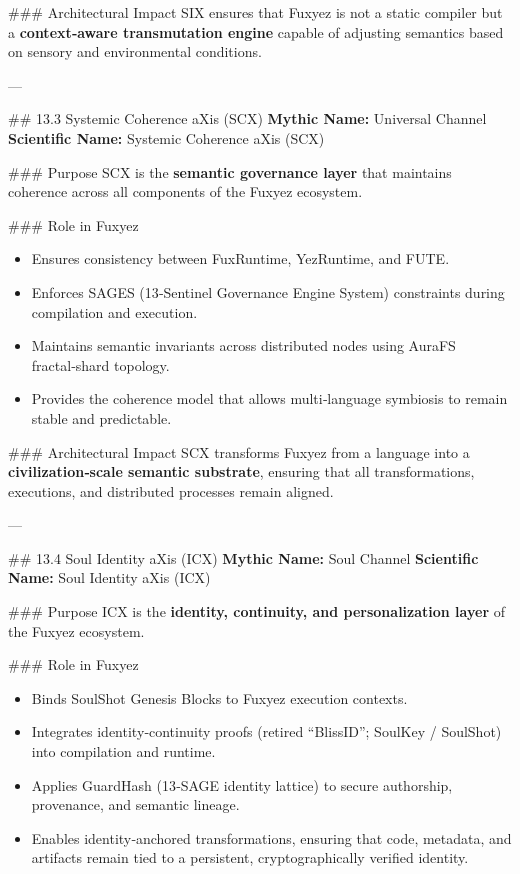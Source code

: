 \begin{enumerate}
\#\#\# Architectural Impact  
SIX ensures that Fuxyez is not a static compiler but a \textbf{context‑aware transmutation engine} capable of adjusting semantics based on sensory and environmental conditions.

---

\#\# 13.3 Systemic Coherence aXis (SCX)  
\textbf{Mythic Name:} Universal Channel  
\textbf{Scientific Name:} Systemic Coherence aXis (SCX)

\#\#\# Purpose  
SCX is the \textbf{semantic governance layer} that maintains coherence across all components of the Fuxyez ecosystem.

\#\#\# Role in Fuxyez  
\begin{itemize}
  \item Ensures consistency between FuxRuntime, YezRuntime, and FUTE.  
  \item Enforces SAGES (13‑Sentinel Governance Engine System) constraints during compilation and execution.  
  \item Maintains semantic invariants across distributed nodes using AuraFS fractal‑shard topology.  
  \item Provides the coherence model that allows multi‑language symbiosis to remain stable and predictable.
\end{itemize}

\#\#\# Architectural Impact  
SCX transforms Fuxyez from a language into a \textbf{civilization‑scale semantic substrate}, ensuring that all transformations, executions, and distributed processes remain aligned.

---

\#\# 13.4 Soul Identity aXis (ICX)  
\textbf{Mythic Name:} Soul Channel  
\textbf{Scientific Name:} Soul Identity aXis (ICX)

\#\#\# Purpose  
ICX is the \textbf{identity, continuity, and personalization layer} of the Fuxyez ecosystem.

\#\#\# Role in Fuxyez  
\begin{itemize}
  \item Binds SoulShot Genesis Blocks to Fuxyez execution contexts.  
  \item Integrates identity‑continuity proofs (retired ``BlissID''; SoulKey / SoulShot) into compilation and runtime.  
  \item Applies GuardHash (13‑SAGE identity lattice) to secure authorship, provenance, and semantic lineage.  
  \item Enables identity‑anchored transformations, ensuring that code, metadata, and artifacts remain tied to a persistent, cryptographically verified identity.
\end{itemize}


\end{enumerate}

